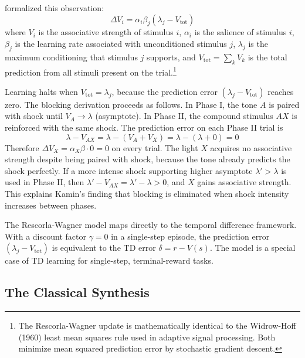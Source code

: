 \citet{RescorlaWagner1972} formalized this observation:
\begin{equation}
\Delta V_i = \alpha_i \beta_j (\lambda_j - V_{\text{tot}})
\end{equation}
where $V_i$ is the associative strength of stimulus $i$, $\alpha_i$ is the salience of stimulus $i$, $\beta_j$ is the learning rate associated with unconditioned stimulus $j$, $\lambda_j$ is the maximum conditioning that stimulus $j$ supports, and $V_{\text{tot}} = \sum_k V_k$ is the total prediction from all stimuli present on the trial.\footnote{The Rescorla-Wagner update is mathematically identical to the Widrow-Hoff (1960) least mean squares rule used in adaptive signal processing. Both minimize mean squared prediction error by stochastic gradient descent.}

Learning halts when $V_{\text{tot}} = \lambda_j$, because the prediction error $(\lambda_j - V_{\text{tot}})$ reaches zero. The blocking derivation proceeds as follows. In Phase I, the tone $A$ is paired with shock until $V_A \to \lambda$ (asymptote). In Phase II, the compound stimulus $AX$ is reinforced with the same shock. The prediction error on each Phase II trial is
\begin{equation}
\lambda - V_{AX} = \lambda - (V_A + V_X) = \lambda - (\lambda + 0) = 0
\end{equation}
Therefore $\Delta V_X = \alpha_X \beta \cdot 0 = 0$ on every trial. The light $X$ acquires no associative strength despite being paired with shock, because the tone already predicts the shock perfectly. If a more intense shock supporting higher asymptote $\lambda' > \lambda$ is used in Phase II, then $\lambda' - V_{AX} = \lambda' - \lambda > 0$, and $X$ gains associative strength. This explains Kamin's finding that blocking is eliminated when shock intensity increases between phases.

The Rescorla-Wagner model maps directly to the temporal difference framework. With a discount factor $\gamma=0$ in a single-step episode, the prediction error $(\lambda_j - V_{\text{tot}})$ is equivalent to the TD error $\delta = r - V(s)$. The model is a special case of TD learning for single-step, terminal-reward tasks.


\subsection{The Classical Synthesis}

